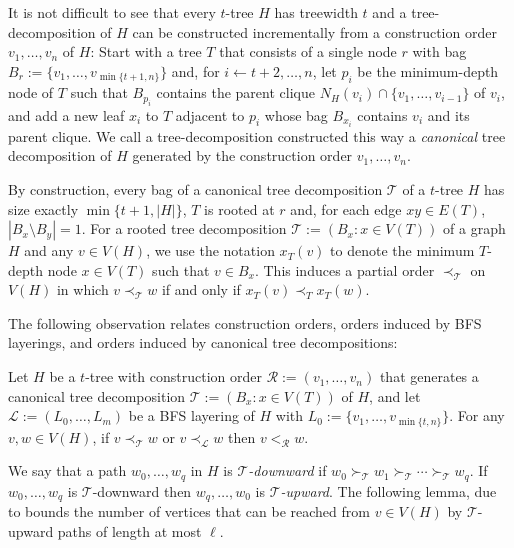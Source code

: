 \documentclass[kpfonts]{patmorin}
\theoremstyle{named}
\begin{document}
It is not difficult to see that every $t$-tree $H$ has treewidth $t$ and a tree-decomposition of $H$ can be constructed incrementally from a construction order $v_1,\ldots,v_n$ of $H$: Start with a tree $T$ that consists of a single node $r$ with bag $B_r:=\{v_1,\ldots,v_{\min\{t+1,n\}}\}$ and, for $i\gets t+2,\ldots,n$, let $p_i$ be the minimum-depth node of $T$ such that $B_{p_i}$ contains the parent clique $N_H(v_i)\cap\{v_1,\ldots,v_{i-1}\}$ of $v_i$, and add a new leaf $x_i$ to $T$ adjacent to $p_i$ whose bag $B_{x_i}$ contains $v_i$ and its parent clique.  We call a tree-decomposition constructed this way a \emph{canonical} tree decomposition of $H$ generated by the construction order $v_1,\ldots,v_n$.

By construction, every bag of a canonical tree decomposition $\mathcal{T}$ of a $t$-tree $H$ has size exactly $\min\{t+1,|H|\}$, $T$ is rooted at $r$ and, for each edge $xy\in E(T)$, $|B_x\setminus B_y|=1$.
For a rooted tree decomposition $\mathcal{T}:=(B_x:x\in V(T))$ of a graph $H$ and any $v\in V(H)$, we use the notation $x_T(v)$ to denote the minimum $T$-depth node $x\in V(T)$ such that $v\in B_x$.  This induces a partial order $\prec_{\mathcal{T}}$ on $V(H)$ in which $v\prec_{\mathcal{T}} w$ if and only if $x_T(v)\prec_T x_T(w)$.

The following observation relates construction orders, orders induced by BFS layerings, and orders induced by canonical tree decompositions:

\begin{obs}\label{order-relation}
    Let $H$ be a $t$-tree with construction order $\mathcal{R}:=(v_1,\ldots,v_n)$ that generates a canonical tree decomposition $\mathcal{T}:=(B_x:x\in V(T))$ of $H$, and let $\mathcal{L}:=(L_0,\ldots,L_m)$ be a BFS layering of $H$ with $L_0:=\{v_1,\ldots,v_{\min\{t,n\}}\}$.  For any $v,w\in V(H)$,
    if $v\prec_{\mathcal{T}} w$ or $v\prec_{\mathcal{L}} w$ then $v<_{\mathcal{R}} w$.
\end{obs}

We say that a path $w_0,\ldots,w_q$ in $H$ is \emph{$\mathcal{T}$-downward} if $w_0\succ_\mathcal{T}w_{1}\succ_\mathcal{T}\cdots\succ_\mathcal{T} w_q$. If $w_0,\ldots,w_q$ is $\mathcal{T}$-downward then $w_q,\ldots,w_0$ is \emph{$\mathcal{T}$-upward}.  The following lemma, due to \citet{pilipczuk.siebertz:polynomial} bounds the number of vertices that can be reached from $v\in V(H)$ by $\mathcal{T}$-upward paths of length at most $\ell$.
\end{document}

